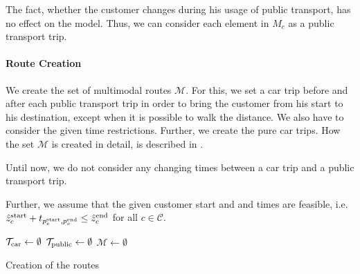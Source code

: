 The fact, whether the customer changes during his usage of public transport, has no effect on the model. Thus, we can consider each element in $M_c$ as a public transport trip.

\paragraph{Route Creation} \parfill

We create the set of multimodal routes $\mathcal{M}$. For this, we set a car trip before and after each public transport trip in order to bring the customer from his start to his destination, except when it is possible to walk the distance. We also have to consider the given time restrictions. Further, we create the pure car trips. How the set $\mathcal{M}$ is created in detail, is described in .

Until now, we do not consider any changing times between a car trip and a public transport trip.

Further, we assume that the given customer start and and times are feasible, i.e. $\hat{z}^{\operatorname{start}}_c+t_{p^{\operatorname{start}}_c,p^{\operatorname{end}}_c}\leq\hat{z}^{\operatorname{end}}_c$ for all $c\in\mathcal{C}$.

\begin{algorithm}
	\SetAlgoLined
	$\mathcal{T}_{\operatorname{car}}\gets\emptyset$\;
	$\mathcal{T}_{\operatorname{public}}\gets\emptyset$\;
	$\mathcal{M}\gets\emptyset$\;
	\caption{Creation of the routes \label{alg:route_creation}}
\end{algorithm}

